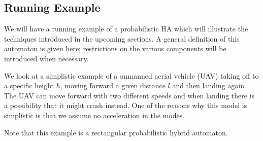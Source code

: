 \subsection{Running Example}
We will have a running example of a probabilistic HA which will illustrate the techniques introduced in the upcoming sections. A general definition of this automaton is given here; restrictions on the various components will be introduced when necessary.
\begin{ex}
    \label{ex:abs}
We look at a simplistic example of a unmanned aerial vehicle (UAV) taking off to a specific height $h$, moving forward a given distance $l$ and then landing again. The UAV can move forward with two different speeds and when landing there is a possibility that it might crash instead. One of the reasons why this model is simplistic is that we assume no acceleration in the modes.

Note that this example is a rectangular probabilistic hybrid automaton.
\begin{figure}[H]
     \begin{center}
\end{center}
\end{figure}
\end{ex}
